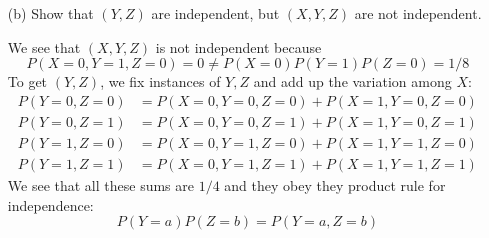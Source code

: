 \documentclass{article}
\begin{document}
\begin{itemize}
        \item [(b)] Show that $(Y, Z)$ are independent, but $(X, Y, Z)$ are not independent. 
            \begin{answer}
                We see that $(X, Y, Z)$ is not independent because
                    \begin{equation*}
                        P(X = 0, Y = 1, Z = 0) = 0 \neq P(X = 0)P(Y = 1)P(Z = 0) = 1/8
                    \end{equation*}
                To get $(Y, Z)$, we fix instances of $Y, Z$ and add up the variation among $X$:
                    \begin{align*}
                        P(Y = 0, Z = 0) &= P(X = 0, Y = 0, Z = 0) + P(X = 1, Y = 0, Z = 0) \\
                        P(Y = 0, Z = 1) &= P(X = 0, Y = 0, Z = 1) + P(X = 1, Y = 0, Z = 1) \\
                        P(Y = 1, Z = 0) &= P(X = 0, Y = 1, Z = 0) + P(X = 1, Y = 1, Z = 0) \\
                        P(Y = 1, Z = 1) &= P(X = 0, Y = 1, Z = 1) + P(X = 1, Y = 1, Z = 1)   
                    \end{align*}
                We see that all these sums are $1/4$ and they obey they product rule for independence:
                    \begin{equation*}
                        P(Y = a)P(Z = b) = P(Y = a, Z = b)
                    \end{equation*}
            \end{answer}
    \end{itemize}

\newpage
\end{document}
